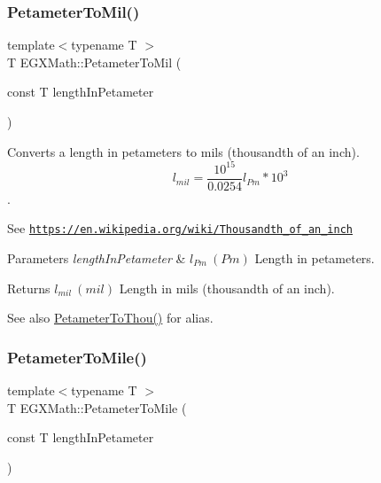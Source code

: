 \subsubsection{\texorpdfstring{Petameter\+To\+Mil()}{PetameterToMil()}}
{\footnotesize\ttfamily template$<$typename T $>$ \\
T E\+G\+X\+Math\+::\+Petameter\+To\+Mil (\begin{DoxyParamCaption}\item[{const T}]{length\+In\+Petameter }\end{DoxyParamCaption})}



Converts a length in petameters to mils (thousandth of an inch). \[ l_{mil}= \frac{10^{15}}{0.0254} l_{Pm} * 10^{3} \]. 

See \href{https://en.wikipedia.org/wiki/Thousandth_of_an_inch}{\tt https\+://en.\+wikipedia.\+org/wiki/\+Thousandth\+\_\+of\+\_\+an\+\_\+inch} 
\begin{DoxyParams}{Parameters}
{\em length\+In\+Petameter} & $ l_{Pm}\ (Pm)$ Length in petameters. \\
\hline
\end{DoxyParams}
\begin{DoxyReturn}{Returns}
$ l_{mil}\ (mil)$ Length in mils (thousandth of an inch). 
\end{DoxyReturn}
\begin{DoxySeeAlso}{See also}
\mbox{\hyperlink{group___e_g_x_math-_conversions-_length_conversions-_petameter-_imperial_gadcb69779fdf2696d6b9e13e2b23e6216}{Petameter\+To\+Thou()}} for alias. 
\end{DoxySeeAlso}
\mbox{\label{group___e_g_x_math-_conversions-_length_conversions-_petameter-_imperial_ga3aa40ba19c1425ed3473c605cf7d4478}} 
\subsubsection{\texorpdfstring{Petameter\+To\+Mile()}{PetameterToMile()}}
{\footnotesize\ttfamily template$<$typename T $>$ \\
T E\+G\+X\+Math\+::\+Petameter\+To\+Mile (\begin{DoxyParamCaption}\item[{const T}]{length\+In\+Petameter }\end{DoxyParamCaption})}



